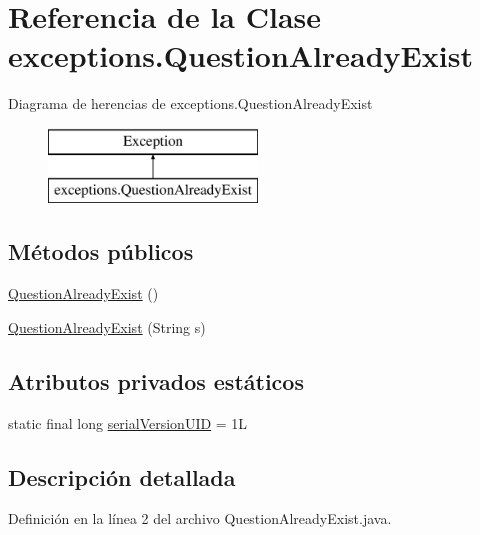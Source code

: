 \hypertarget{classexceptions_1_1QuestionAlreadyExist}{}\section{Referencia de la Clase exceptions.\+Question\+Already\+Exist}
\label{classexceptions_1_1QuestionAlreadyExist}
Diagrama de herencias de exceptions.\+Question\+Already\+Exist\begin{figure}[H]
\begin{center}
\leavevmode
\includegraphics[height=2.000000cm]{classexceptions_1_1QuestionAlreadyExist}
\end{center}
\end{figure}
\subsection*{Métodos públicos}
\begin{DoxyCompactItemize}
\item 
\mbox{\hyperlink{classexceptions_1_1QuestionAlreadyExist_abed5df180abbd882b23b603f7d528eaf}{Question\+Already\+Exist}} ()
\item 
\mbox{\hyperlink{classexceptions_1_1QuestionAlreadyExist_a72cd9055ca4d7a2abd6cc27f79eedecd}{Question\+Already\+Exist}} (String s)
\end{DoxyCompactItemize}
\subsection*{Atributos privados estáticos}
\begin{DoxyCompactItemize}
\item 
static final long \mbox{\hyperlink{classexceptions_1_1QuestionAlreadyExist_ad906b7497e316499971a61b39b749a94}{serial\+Version\+U\+ID}} = 1L
\end{DoxyCompactItemize}


\subsection{Descripción detallada}


Definición en la línea 2 del archivo Question\+Already\+Exist.\+java.



